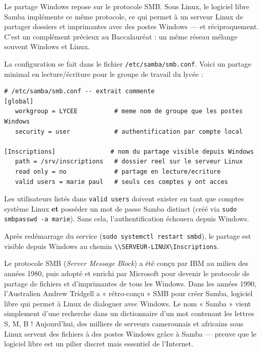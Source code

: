 \documentclass[11pt]{article}
\newcommand{\cle}[1]{{\popxbold\color{popdark}#1}}
\newcounter{popsec}
\newcounter{popsub}
\newcommand{\courssub}[1]{%
  \stepcounter{popsub}%
  \par\vspace{9pt}\noindent{\popxbold\fontsize{11.5}{13}\selectfont\color{popink}{\color{poporange}\thepopsec.\thepopsub}\hspace{6pt}#1}\par\nopagebreak\vspace{4pt}
}
\begin{document}
\courssub{L'équivalent sous Linux : Samba}

Le partage Windows repose sur le protocole \cle{SMB}. Sous Linux, le logiciel libre \cle{Samba} implémente ce même protocole, ce qui permet à un serveur Linux de partager dossiers et imprimantes avec des postes Windows — et réciproquement. C'est un complément précieux au Baccalauréat : un même réseau mélange souvent Windows et Linux.

La configuration se fait dans le fichier \texttt{/etc/samba/smb.conf}. Voici un partage minimal en lecture/écriture pour le groupe de travail du lycée :

\begin{lstlisting}
# /etc/samba/smb.conf -- extrait commente
[global]
   workgroup = LYCEE          # meme nom de groupe que les postes Windows
   security = user            # authentification par compte local

[Inscriptions]               # nom du partage visible depuis Windows
   path = /srv/inscriptions   # dossier reel sur le serveur Linux
   read only = no             # partage en lecture/ecriture
   valid users = marie paul   # seuls ces comptes y ont acces
\end{lstlisting}

\begin{attention}
Les utilisateurs listés dans \texttt{valid users} doivent exister en tant que comptes système Linux \textbf{et} posséder un mot de passe Samba distinct (créé via \texttt{sudo smbpasswd -a marie}). Sans cela, l'authentification échouera depuis Windows.
\end{attention}

Après redémarrage du service (\texttt{sudo systemctl restart smbd}), le partage est visible depuis Windows au chemin \texttt{\textbackslash\textbackslash SERVEUR-LINUX\textbackslash Inscriptions}.

\begin{savaistu}
Le protocole \cle{SMB} (\emph{Server Message Block}) a été conçu par IBM au milieu des années 1980, puis adopté et enrichi par Microsoft pour devenir le protocole de partage de fichiers et d'imprimantes de tous les Windows. Dans les années 1990, l'Australien Andrew Tridgell a « rétro-conçu » SMB pour créer \cle{Samba}, logiciel libre qui permet à Linux de dialoguer avec Windows. Le nom « Samba » vient simplement d'une recherche dans un dictionnaire d'un mot contenant les lettres S, M, B ! Aujourd'hui, des milliers de serveurs camerounais et africains sous Linux servent des fichiers à des postes Windows grâce à Samba — preuve que le logiciel libre est un pilier discret mais essentiel de l'Internet.
\end{savaistu}
\end{document}
